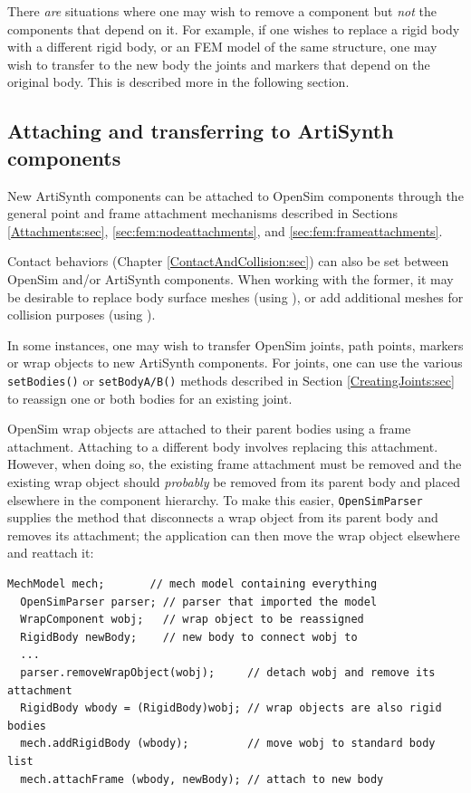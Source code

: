 There {\it are} situations where one may wish to remove a component but {\it
not} the components that depend on it. For example, if one wishes to replace a
rigid body with a different rigid body, or an FEM model of the same structure,
one may wish to transfer to the new body the joints and markers that depend on
the original body. This is described more in the following section.

\subsection{Attaching and transferring to ArtiSynth components}
\label{OpenSimAttaching:sec}

New ArtiSynth components can be attached to OpenSim components through the
general point and frame attachment mechanisms described in Sections
\ref{Attachments:sec}, \ref{sec:fem:nodeattachments}, and
\ref{sec:fem:frameattachments}.

Contact behaviors (Chapter \ref{ContactAndCollision:sec}) can also be set
between OpenSim and/or ArtiSynth components. When working with the former, it
may be desirable to replace body surface meshes
(using ), or add additional
meshes for collision purposes (using ).

In some instances, one may wish to transfer OpenSim joints, path points,
markers or wrap objects to new ArtiSynth components.  For joints, one can use
the various {\tt setBodies()} or {\tt setBodyA/B()} methods described in
Section \ref{CreatingJoints:sec} to reassign one or both bodies for an existing
joint. 

OpenSim wrap objects are attached to their parent bodies using a frame
attachment. Attaching to a different body involves replacing this
attachment. However, when doing so, the existing frame attachment must be
removed and the existing wrap object should {\it probably} be removed from its
parent body and placed elsewhere in the component hierarchy. To make this
easier, {\tt OpenSimParser} supplies the method
 that disconnects a wrap
object from its parent body and removes its attachment; the application can
then move the wrap object elsewhere and reattach it:
%
\begin{lstlisting}[]
  MechModel mech;       // mech model containing everything
  OpenSimParser parser; // parser that imported the model
  WrapComponent wobj;   // wrap object to be reassigned
  RigidBody newBody;    // new body to connect wobj to
  ...
  parser.removeWrapObject(wobj);     // detach wobj and remove its attachment
  RigidBody wbody = (RigidBody)wobj; // wrap objects are also rigid bodies
  mech.addRigidBody (wbody);         // move wobj to standard body list
  mech.attachFrame (wbody, newBody); // attach to new body
\end{lstlisting}
%

